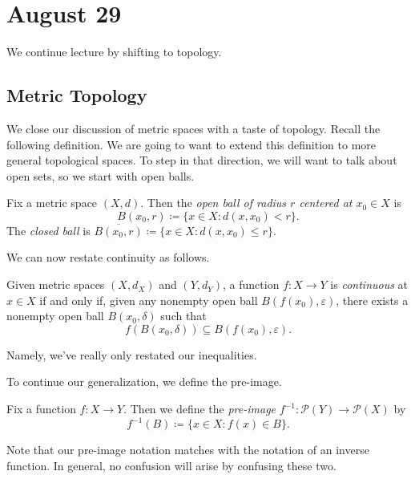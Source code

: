 \documentclass[../notes.tex]{subfiles}
\begin{document}
\section{August 29}

We continue lecture by shifting to topology.

\subsection{Metric Topology}
We close our discussion of metric spaces with a taste of topology. Recall the following definition.
\contdef*
\noindent We are going to want to extend this definition to more general topological spaces. To step in that direction, we will want to talk about open sets, so we start with open balls.
\begin{definition}[Ball]
	Fix a metric space $(X,d)$. Then the \textit{open ball of radius $r$ centered at $x_0\in X$} is
	\[B(x_0,r)\coloneqq\{x\in X:d(x,x_0)<r\}.\]
	The \textit{closed ball} is $\overline{B(x_0,r)}\coloneqq\{x\in X:d(x,x_0)\le r\}$.
\end{definition}
We can now restate continuity as follows.
\begin{defihelper}[Continuous]
	Given metric spaces $(X,d_X)$ and $(Y,d_Y)$, a function $f\colon X\to Y$ is \textit{continuous} at $x\in X$ if and only if, given any nonempty open ball $B(f(x_0),\varepsilon)$, there exists a nonempty open ball $B(x_0,\delta)$ such that
	\[f(B(x_0,\delta))\subseteq B(f(x_0),\varepsilon).\]
\end{defihelper}
Namely, we've really only restated our inequalities.

To continue our generalization, we define the pre-image.
\begin{definition}
	Fix a function $f\colon X\to Y$. Then we define the \textit{pre-image} $f^{-1}\colon\mathcal P(Y)\to\mathcal P(X)$ by
	\[f^{-1}(B)\coloneqq\{x\in X:f(x)\in B\}.\]
\end{definition}
Note that our pre-image notation matches with the notation of an inverse function. In general, no confusion will arise by confusing these two.
\end{document}
